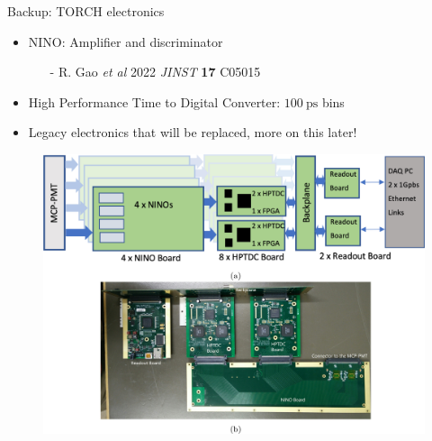 \documentclass[xcolor={dvipsnames}]{beamer}
\begin{document}
\begin{frame}{Backup: TORCH electronics}
  \begin{itemize}
    \setlength\itemsep{0.7em}
    \item{NINO: Amplifier and discriminator}
    \begin{itemize}
      \item[-]{R. Gao \textit{et al} 2022 \textit{JINST} \textbf{17} C05015}
    \end{itemize}
    \item{High Performance Time to Digital Converter: $\SI{100}{\pico\second}$ bins}
    \item{Legacy electronics that will be replaced, more on this later!}
  \end{itemize}
  \begin{figure}
    \centering
    \includegraphics[width = 1.0\textwidth,trim={0 0.3cm 0 4.2cm},clip=true]{Figs/TORCH_testbeam_2018_electronics.jpg}
  \end{figure}
\end{frame}
\end{document}
